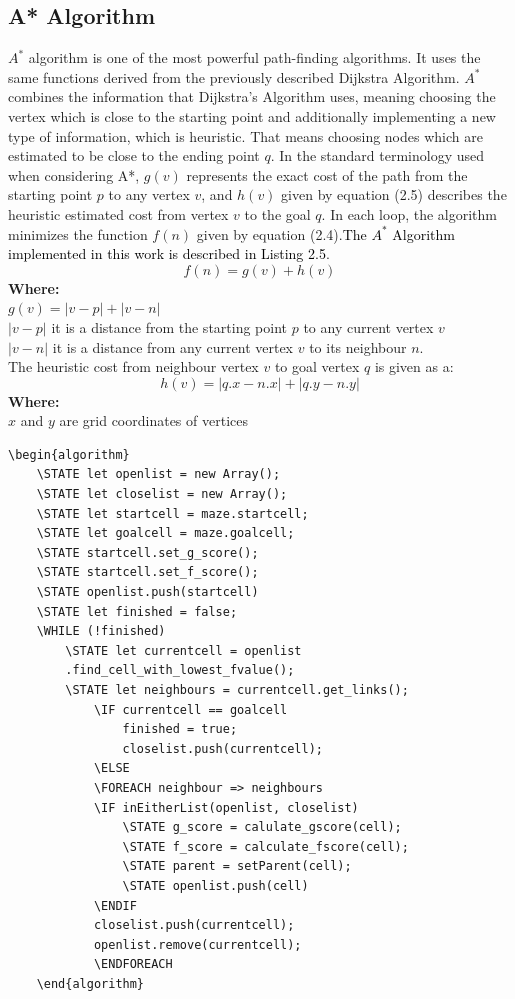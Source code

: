 \subsection{A* Algorithm}
$A^*$ algorithm is one of the most powerful path-finding algorithms. It uses the same functions derived from the previously described Dijkstra Algorithm. $A^*$ combines the information that Dijkstra’s Algorithm uses, meaning choosing the vertex which is close to the starting point and additionally implementing a new type of information, which is heuristic. That means choosing nodes which are estimated to be close to the ending point $q$. 
In the standard terminology used when considering A*, $g(v)$ represents the exact cost of the path from the starting point $p$ to any vertex $v$, and $h(v)$ given by equation (2.5) describes the heuristic estimated cost from vertex $v$ to the goal $q$. In each loop, the algorithm minimizes the function $f(n)$ given by equation (2.4).\textcolor{black}{The $A^*$ Algorithm implemented in this work is described in Listing 2.5}.
\begin{equation}
f(n) = g(v) + h(v)
\end{equation}
\textbf{Where:}\\
$g(v)= |v - p| + |v - n|$\\
$|v - p|$ it is a distance from the starting point $p$ to any current vertex $v$\\
$|v - n|$ it is a distance from any current vertex $v$ to its neighbour $n$.\\
\newline
The heuristic cost from neighbour vertex $v$ to goal vertex $q$ is given as a:
\begin{equation}
h(v) = |q.x - n.x| + |q.y - n.y|
\end{equation}
\textbf{Where:}\\
$x$ and $y$ are grid coordinates of vertices\\

\begin{lstlisting}[caption={Pseudocode for a A* algorithm}]
	\begin{algorithm}
	\STATE let openlist = new Array();
	\STATE let closelist = new Array();
	\STATE let startcell = maze.startcell;
	\STATE let goalcell = maze.goalcell;
	\STATE startcell.set_g_score();
	\STATE startcell.set_f_score();
	\STATE openlist.push(startcell)
	\STATE let finished = false;
	\WHILE (!finished)
		\STATE let currentcell = openlist    
		.find_cell_with_lowest_fvalue();
		\STATE let neighbours = currentcell.get_links();
			\IF currentcell == goalcell
				finished = true;
				closelist.push(currentcell);
			\ELSE 
			\FOREACH neighbour => neighbours	
			\IF inEitherList(openlist, closelist)
				\STATE g_score = calulate_gscore(cell);
				\STATE f_score = calculate_fscore(cell);
				\STATE parent = setParent(cell);
				\STATE openlist.push(cell)
			\ENDIF
			closelist.push(currentcell);
			openlist.remove(currentcell);
	    	\ENDFOREACH
	\end{algorithm}
	\end{lstlisting}
%